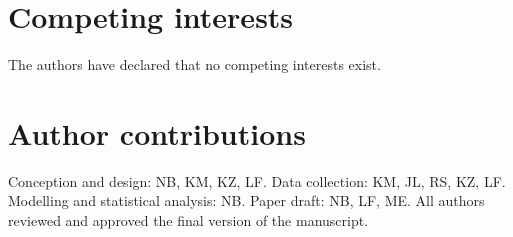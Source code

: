 \documentclass[fleqn,11pt]{wlscirep}
\begin{document}
\section*{Competing interests}
The authors have declared that no competing interests exist.

\section*{Author contributions}
Conception and design: NB, KM, KZ, LF. Data collection: KM, JL, RS, KZ, LF. Modelling and statistical analysis: NB. Paper draft: NB, LF, ME. All authors reviewed and approved the final version of the manuscript.

\newpage


\end{document}
